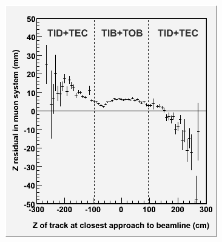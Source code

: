 \documentclass[compress]{beamer}
\begin{document}
\begin{frame}
\begin{columns}
\includegraphics[width=\linewidth]{zresid_from_tracker_innerbottom.png}
\end{columns}
\end{frame}
\end{document}
